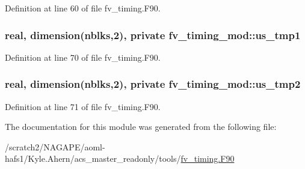 Definition at line 60 of file fv\-\_\-timing.\-F90.

\subsubsection[{us\-\_\-tmp1}]{\setlength{\rightskip}{0pt plus 5cm}real, dimension({\bf nblks},2), private fv\-\_\-timing\-\_\-mod\-::us\-\_\-tmp1\hspace{0.3cm}{\ttfamily [private]}}\label{classfv__timing__mod_ab8d555b44911d2782f74f538a6eaa432}


Definition at line 70 of file fv\-\_\-timing.\-F90.

\subsubsection[{us\-\_\-tmp2}]{\setlength{\rightskip}{0pt plus 5cm}real, dimension({\bf nblks},2), private fv\-\_\-timing\-\_\-mod\-::us\-\_\-tmp2\hspace{0.3cm}{\ttfamily [private]}}\label{classfv__timing__mod_a0bf15deed4130bdab7908785c80d9e70}


Definition at line 71 of file fv\-\_\-timing.\-F90.



The documentation for this module was generated from the following file\-:\begin{DoxyCompactItemize}
\item 
/scratch2/\-N\-A\-G\-A\-P\-E/aoml-\/hafs1/\-Kyle.\-Ahern/acs\-\_\-master\-\_\-readonly/tools/\hyperlink{fv__timing_8F90}{fv\-\_\-timing.\-F90}\end{DoxyCompactItemize}
